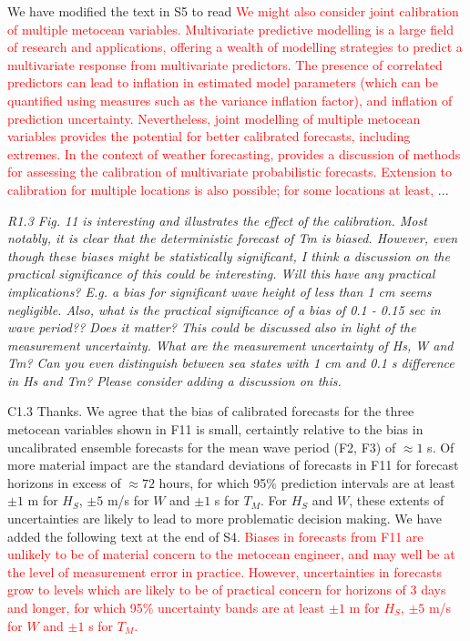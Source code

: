 \documentclass[a4paper,10pt]{article}
\newcommand{\ed}[1]{\textcolor{red}{#1}}
\begin{document}
	We have modified the text in S5 to read \ed{We might also consider joint calibration of multiple metocean variables. Multivariate predictive modelling is a large field of research and applications, offering a wealth of modelling strategies to predict a multivariate response from multivariate predictors. The presence of correlated predictors can lead to inflation in estimated model parameters (which can be quantified using measures such as the variance inflation factor), and inflation of prediction uncertainty. Nevertheless, joint modelling of multiple metocean variables provides the potential for better calibrated forecasts, including extremes. In the context of weather forecasting, \cite{AllEA24} provides a discussion of methods for assessing the calibration of multivariate probabilistic forecasts. Extension to calibration for multiple locations is also possible; for some locations at least,} ...
	
	\emph{R1.3 Fig. 11 is interesting and illustrates the effect of the calibration. Most notably, it is clear that the deterministic forecast of Tm is biased. However, even though these biases might be statistically significant, I think a discussion on the practical significance of this could be interesting. Will this have any practical implications? E.g. a bias for significant wave height of less than 1 cm seems negligible. Also, what is the practical significance of a bias of 0.1 - 0.15 sec in wave period?? Does it matter? This could be discussed also in light of the measurement uncertainty. What are the measurement uncertainty of Hs, W and Tm? Can you even distinguish between sea states with 1 cm and 0.1 s difference in Hs and Tm? Please consider adding a discussion on this.}
		
	C1.3 Thanks. We agree that the bias of calibrated forecasts for the three metocean variables shown in F11 is small, certaintly relative to the bias in uncalibrated ensemble forecasts for the mean wave period (F2, F3) of $\approx 1$ s. Of more material impact are the standard deviations of forecasts in F11 for forecast horizons in excess of $\approx 72$ hours, for which 95\% prediction intervals are at least $\pm 1$ m for $H_S$, $\pm 5$ m/s for $W$ and $\pm 1$ s for $T_M$. For $H_S$ and $W$, these extents of uncertainties are likely to lead to more problematic decision making. We have added the following text at the end of S4. \ed{Biases in forecasts from F11 are unlikely to be of material concern to the metocean engineer, and may well be at the level of measurement error in practice. However, uncertainties in forecasts grow to levels which are likely to be of practical concern for horizons of 3 days and longer, for which 95\% uncertainty bands are at least $\pm 1$ m for $H_S$, $\pm 5$ m/s for $W$ and $\pm 1$ s for $T_M$.} 
	
\end{document}
